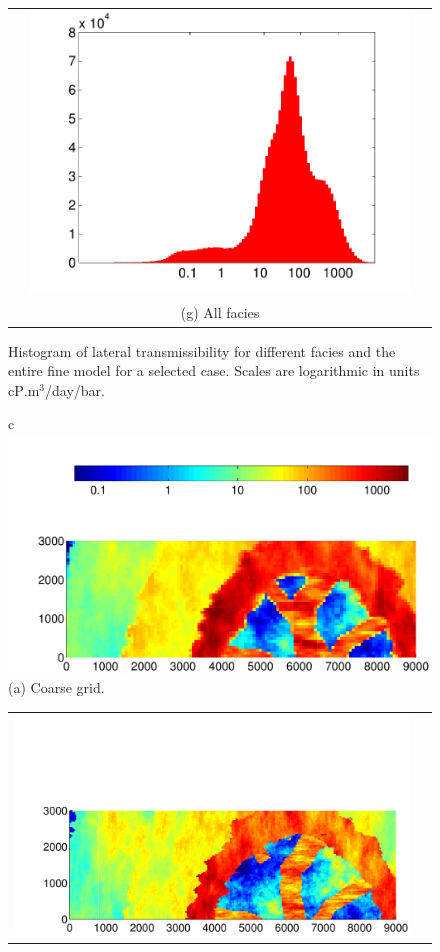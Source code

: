 \begin{figure}
\begin{tabular}{ccc}
&\includegraphics[width=0.3 \linewidth,natwidth=462bp,natheight=399bp]{./figurer/kxh_All.pdf}&\\&(g) All facies&
\end{tabular}
\caption{Histogram of lateral transmissibility for different facies and the entire fine model for a selected case. Scales are logarithmic in units cP$.$m$^3$/day/bar.}
\label{fig:kxh}
\end{figure}

\begin{figure}
\begin{tabular}{c}
\includegraphics[trim=1.2cm 0cm 0cm 0cm, clip=true,width=0.8\linewidth]{./figurer/permxc}\\(a) Coarse grid.\\
\begin{minipage}{1\textwidth}
\begin{tabular}{cc}
\includegraphics[trim=0.5cm 0cm 0cm 2.5cm, clip=true,width=0.5 \linewidth]
{./figurer/fineSat1}&
\includegraphics[trim=0.5cm 0cm 0cm 2.5cm, clip=true,width=0.5 \linewidth]

\end{tabular}
\end{minipage}
\end{tabular}
\end{figure}

